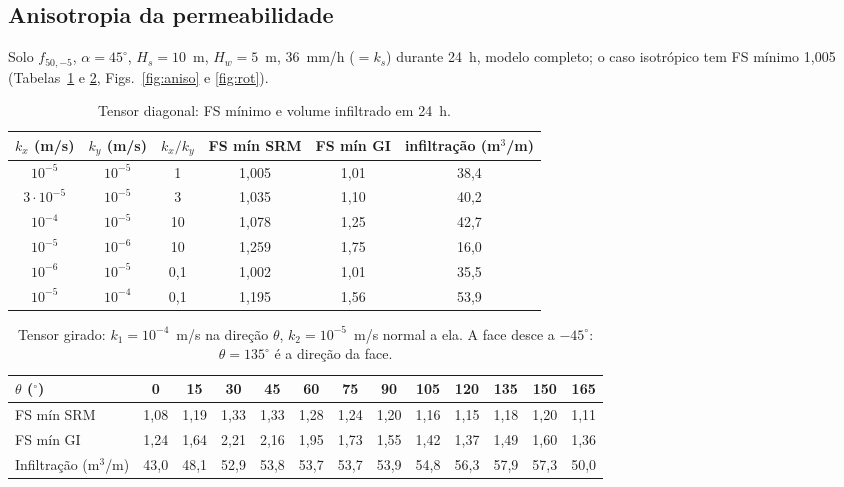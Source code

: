 \subsection{Anisotropia da permeabilidade}

Solo $f_{50,-5}$, $\alpha=45^\circ$, $H_s=10$~m, $H_w=5$~m, 36~mm/h ($=k_s$) durante 24~h, modelo completo; o caso
isotr\'opico tem FS m\'inimo 1,005 (Tabelas~\ref{tab:aniso} e \ref{tab:rot}, Figs.~\ref{fig:aniso} e \ref{fig:rot}).

\begin{table}[htbp]
\centering
\caption{Tensor diagonal: FS m\'inimo e volume infiltrado em 24~h.}\label{tab:aniso}
\begin{tabular}{cccccc}
\toprule
$k_x$ (m/s) & $k_y$ (m/s) & $k_x/k_y$ & FS m\'in SRM & FS m\'in GI & infiltra\c{c}\~ao (m$^3$/m)\\
\midrule
$10^{-5}$ & $10^{-5}$ & 1 & 1,005 & 1,01 & 38,4\\
$3\cdot10^{-5}$ & $10^{-5}$ & 3 & 1,035 & 1,10 & 40,2\\
$10^{-4}$ & $10^{-5}$ & 10 & 1,078 & 1,25 & 42,7\\
$10^{-5}$ & $10^{-6}$ & 10 & 1,259 & 1,75 & 16,0\\
$10^{-6}$ & $10^{-5}$ & 0,1 & 1,002 & 1,01 & 35,5\\
$10^{-5}$ & $10^{-4}$ & 0,1 & 1,195 & 1,56 & 53,9\\
\bottomrule
\end{tabular}
\end{table}

\begin{table}[htbp]
\centering
\caption{Tensor girado: $k_1=10^{-4}$~m/s na dire\c{c}\~ao $\theta$, $k_2=10^{-5}$~m/s normal a ela. A face desce a
$-45^\circ$: $\theta=135^\circ$ \'e a dire\c{c}\~ao da face.}\label{tab:rot}
\setlength{\tabcolsep}{4pt}
\begin{tabular}{lcccccccccccc}
\toprule
$\theta$ ($^\circ$) & 0 & 15 & 30 & 45 & 60 & 75 & 90 & 105 & 120 & 135 & 150 & 165\\
\midrule
FS m\'in SRM & 1,08 & 1,19 & 1,33 & 1,33 & 1,28 & 1,24 & 1,20 & 1,16 & 1,15 & 1,18 & 1,20 & 1,11\\
FS m\'in GI & 1,24 & 1,64 & 2,21 & 2,16 & 1,95 & 1,73 & 1,55 & 1,42 & 1,37 & 1,49 & 1,60 & 1,36\\
Infiltra\c{c}\~ao (m$^3$/m) & 43,0 & 48,1 & 52,9 & 53,8 & 53,7 & 53,7 & 53,9 & 54,8 & 56,3 & 57,9 & 57,3 & 50,0\\
\bottomrule
\end{tabular}
\end{table}

